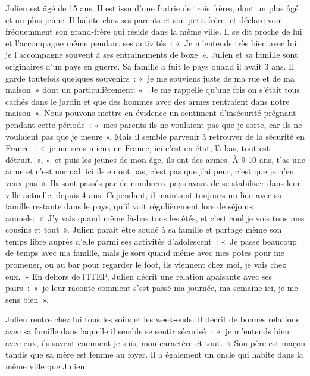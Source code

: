 \documentclass[12pt, a4paper]{book}
\begin{document}
\begin{spacing}{1.5}
Julien est âgé de 15 ans. Il est issu d'une fratrie de trois frères, dont un plus âgé et un plus jeune. Il habite chez ses parents et son petit-frère, et déclare voir fréquemment son grand-frère qui réside dans la même ville. Il se dit proche de lui et l'accompagne même pendant ses activités : « Je m'entends très bien avec lui, je l'accompagne souvent à ses entrainements de boxe ».   Julien et sa famille sont  originaires d'un pays en guerre. Sa famille a fuit le pays quand il avait 3 ans. Il garde toutefois quelques souvenirs : « je me souviens juste de ma rue et de ma maison » dont un particulièrement: «  Je me rappelle qu'une fois on s'était tous cachés dans le jardin et que des hommes avec des armes rentraient dans notre maison ». Nous pouvons mettre en évidence un sentiment d'insécurité prégnant pendant cette période : « mes parents ils ne voulaient pas que je sorte, car ils ne voulaient pas que je meure ». Mais il semble parvenir à retrouver de la sécurité en France : « je me sens mieux en France, ici c'est en état, là-bas, tout est détruit. », « et puis les jeunes de mon âge, ils ont des armes. À 9-10 ans, t'as une arme et c'est normal, ici ils en ont pas, c'est pas que j'ai peur, c'est que je n'en veux pas ». Ils sont passés par de nombreux pays avant de se stabiliser dans leur ville actuelle, depuis 4 ans. Cependant, il maintient toujours un lien avec sa famille restante dans le pays, qu'il voit régulièrement lors de séjours annuels: « J'y vais quand même là-bas tous les étés, et c'est cool je vois tous mes cousins et tout ». Julien paraît être soudé à sa famille et partage même son temps libre auprès d'elle parmi ses activités d'adolescent : « Je passe beaucoup de temps avec ma famille, mais je sors quand même avec mes potes pour me promener, ou au bar pour regarder le foot, ils viennent chez moi, je vais chez eux. » En dehors de l'ITEP, Julien décrit une relation apaisante avec ses pairs : « je leur raconte comment s'est passé ma journée, ma semaine ici, je me sens bien ».

Julien rentre chez lui tous les soirs et les week-ends. Il décrit de bonnes relations avec sa famille dans laquelle il semble se sentir sécurisé : « je m'entends bien avec eux, ils savent comment je suis, mon caractère et tout. » Son père est maçon tandis que sa mère est femme au foyer. Il a également un oncle qui habite dans la même ville que Julien.


\end{spacing}
\end{document}
